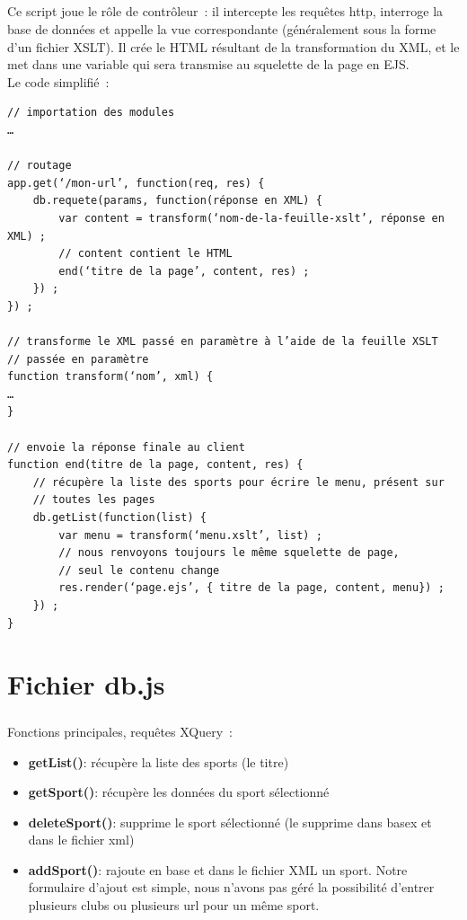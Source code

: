 \documentclass{report}
\begin{document}
	\paragraph{}{
		Ce script joue le rôle de contrôleur : il intercepte les requêtes http, interroge la base de données et appelle la vue correspondante (généralement sous la forme d’un fichier XSLT). Il crée le HTML résultant de la transformation du XML, et le met dans une variable qui sera transmise au squelette de la page en EJS. \\
		Le code simplifié :

\begin{Verbatim}
// importation des modules
…

// routage
app.get(‘/mon-url’, function(req, res) {
	db.requete(params, function(réponse en XML) {
		var content = transform(‘nom-de-la-feuille-xslt’, réponse en XML) ;
		// content contient le HTML
		end(‘titre de la page’, content, res) ;
	}) ;
}) ;

// transforme le XML passé en paramètre à l’aide de la feuille XSLT
// passée en paramètre
function transform(‘nom’, xml) {
…
}

// envoie la réponse finale au client
function end(titre de la page, content, res) {
	// récupère la liste des sports pour écrire le menu, présent sur
	// toutes les pages
	db.getList(function(list) {
		var menu = transform(‘menu.xslt’, list) ;
		// nous renvoyons toujours le même squelette de page,
		// seul le contenu change
		res.render(‘page.ejs’, { titre de la page, content, menu}) ;
	}) ;
}
\end{Verbatim}
	}




%
\chapter{Fichier db.js}
\thispagestyle{fancy}
	\paragraph{}{
		Fonctions principales, requêtes XQuery :\\

		\begin{itemize}
			\item \textbf{getList()}: récupère la liste des sports (le titre)
			\item \textbf{getSport()}: récupère les données du sport sélectionné
			\item \textbf{deleteSport()}: supprime le sport sélectionné (le supprime dans basex et dans le fichier xml)
			\item \textbf{addSport()}: rajoute en base et dans le fichier XML un sport. Notre formulaire d’ajout est simple, nous n’avons pas géré la possibilité d’entrer plusieurs clubs ou plusieurs url pour un même sport.
		\end{itemize}
	}
\end{document}

